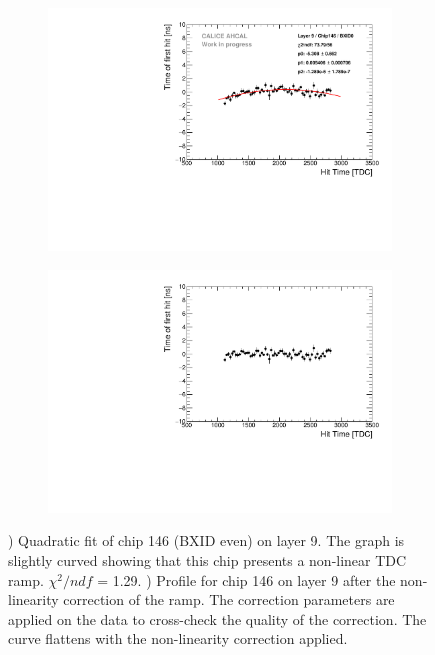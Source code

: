 \begin{figure}[htbp!]
	\begin{subfigure}[t]{0.49\textwidth}
		\centering
		\includegraphics[width=1\textwidth]{../Thesis_Plots/Timing/Muons/Plots/LinearityCorrection_Module09_Chip146_BXID0.pdf}
		\caption{}\label{fig:LinCorr}
	\end{subfigure}
	\hfill
	\begin{subfigure}[t]{0.49\textwidth}
		\centering
		\includegraphics[width=1\textwidth]{../Thesis_Plots/Timing/Muons/Plots/LinearityCorrection_Module09_Chip146_BXID0_Corrected.pdf}
		\caption{}\label{fig:LinCorr_2}
	\end{subfigure}
	\caption{) Quadratic fit of chip 146 (BXID even) on layer 9. The graph is slightly curved showing that this chip presents a non-linear TDC ramp. $\chi^2/ndf$ = 1.29. ) Profile for chip 146 on layer 9 after the non-linearity correction of the ramp. The correction parameters are applied on the data to cross-check the quality of the correction. The curve flattens with the non-linearity correction applied.}
\end{figure}

